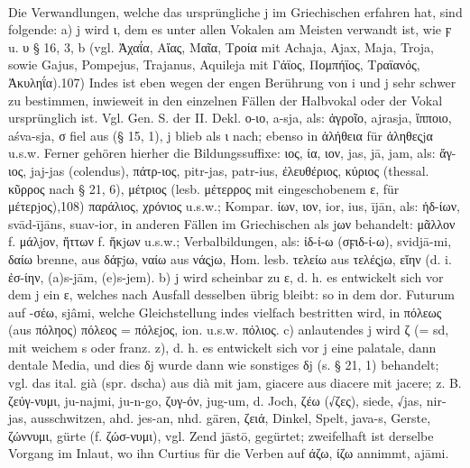 \paragraph{} Die Verwandlungen, welche das ursprüngliche j im Griechischen erfahren hat, sind folgende: a) j wird ι, dem es unter allen Vokalen am Meisten verwandt ist, wie ϝ u. υ § 16, 3, b (vgl. Ἀχαΐα, Αἴας, Μαῖα, Τροία mit Achaja, Ajax, Maja, Troja, sowie Gajus, Pompejus, Trajanus, Aquileja mit Γάϊος, Πομπήϊος, Τραϊανός, Ἀκυληΐα).107) Indes ist eben wegen der engen Berührung von i und j sehr schwer zu bestimmen, inwieweit in den einzelnen Fällen der Halbvokal oder der Vokal ursprünglich ist. Vgl. Gen. S. der II. Dekl. ο-ιο,  a-sja, als: ἀγροῖο,  ajrasja, ἵπποιο,  aśva-sja, σ fiel aus (§ 15, 1), j blieb als ι nach; ebenso in ἀλήθεια für ἀληθεςjα u.s.w. Ferner gehören hierher die Bildungssuffixe: ιος, ία, ιον,  jas, jā, jam, als: ἅγ-ιος,  jaj-jas (colendus), πάτρ-ιος,  pitr-jas,  patr-ius, ἐλευθέριος, κύριος (thessal. κῦρρος nach § 21, 6), μέτριος (lesb. μέτερρος mit eingeschobenem ε, für μέτερjος),108) παράλιος, χρόνιος u.s.w.; Kompar. ίων, ιον,  ior, ius,  ījān, als: ἡδ-ίων,  svād-ījāns,  suav-ior, in anderen Fällen im Griechischen als jων behandelt: μᾶλλον f. μάλjον, ἥττων f. ἥκjων u.s.w.; Verbalbildungen, als: ἰδ-ί-ω (σϝιδ-ί-ω),  svidjā-mi, δαίω brenne, aus δάϝjω, ναίω aus νάςjω, Hom. lesb. τελείω aus τελέςjω, εἴην (d. i. ἐσ-ίην,  (a)s-jām,  (e)s-jem). b) j wird scheinbar zu ε, d. h. es entwickelt sich vor dem j ein ε, welches nach Ausfall desselben übrig bleibt: so in dem dor. Futurum auf -σέω,  sjâmi, welche Gleichstellung indes vielfach bestritten wird, in πόλεως (aus πόληος) πόλεος = πόλεjος, ion. u.s.w. πόλιος. c) anlautendes j wird ζ (= sd, mit weichem s oder franz. z), d. h. es entwickelt sich vor j eine palatale, dann dentale Media, und dies δj wurde dann wie sonstiges δj (s. § 21, 1) behandelt; vgl. das ital. già (spr. dscha) aus dià mit  jam, giacere aus diacere mit  jacere; z. B. ζεύγ-νυμι,  ju-najmi,  ju-n-go, ζυγ-όν,  jug-um, d. Joch, ζέω (√ζες), siede,  √jas, nir-jas, ausschwitzen, ahd. jes-an, nhd. gären, ζειά, Dinkel, Spelt,  java-s, Gerste, ζώννυμι, gürte (f. ζώσ-νυμι), vgl. Zend jāstō, gegürtet; zweifelhaft ist derselbe Vorgang im Inlaut, wo ihn Curtius für die Verben auf άζω, ίζω annimmt,  ajāmi. 

